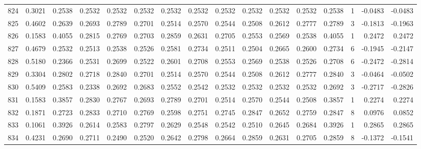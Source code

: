 \begin{tabular}{lrrrrrrrrrrrrrrr}
824 &      0.3021 &  0.2538 &  0.2532 &  0.2532 &  0.2532 &  0.2532 &  0.2532 &  0.2532 &  0.2532 &  0.2532 &   0.2532 &     0.2538 &      1 &                   -0.0483 &                    -0.0483 \\
825 &      0.4602 &  0.2639 &  0.2693 &  0.2789 &  0.2701 &  0.2514 &  0.2570 &  0.2544 &  0.2508 &  0.2612 &   0.2777 &     0.2789 &      3 &                   -0.1813 &                    -0.1963 \\
826 &      0.1583 &  0.4055 &  0.2815 &  0.2769 &  0.2703 &  0.2859 &  0.2631 &  0.2705 &  0.2553 &  0.2569 &   0.2538 &     0.4055 &      1 &                    0.2472 &                     0.2472 \\
827 &      0.4679 &  0.2532 &  0.2513 &  0.2538 &  0.2526 &  0.2581 &  0.2734 &  0.2511 &  0.2504 &  0.2665 &   0.2600 &     0.2734 &      6 &                   -0.1945 &                    -0.2147 \\
828 &      0.5180 &  0.2366 &  0.2531 &  0.2699 &  0.2522 &  0.2601 &  0.2708 &  0.2553 &  0.2569 &  0.2538 &   0.2526 &     0.2708 &      6 &                   -0.2472 &                    -0.2814 \\
829 &      0.3304 &  0.2802 &  0.2718 &  0.2840 &  0.2701 &  0.2514 &  0.2570 &  0.2544 &  0.2508 &  0.2612 &   0.2777 &     0.2840 &      3 &                   -0.0464 &                    -0.0502 \\
830 &      0.5409 &  0.2583 &  0.2338 &  0.2692 &  0.2683 &  0.2552 &  0.2542 &  0.2532 &  0.2532 &  0.2532 &   0.2532 &     0.2692 &      3 &                   -0.2717 &                    -0.2826 \\
831 &      0.1583 &  0.3857 &  0.2830 &  0.2767 &  0.2693 &  0.2789 &  0.2701 &  0.2514 &  0.2570 &  0.2544 &   0.2508 &     0.3857 &      1 &                    0.2274 &                     0.2274 \\
832 &      0.1871 &  0.2723 &  0.2833 &  0.2710 &  0.2769 &  0.2598 &  0.2751 &  0.2745 &  0.2847 &  0.2652 &   0.2759 &     0.2847 &      8 &                    0.0976 &                     0.0852 \\
833 &      0.1061 &  0.3926 &  0.2614 &  0.2583 &  0.2797 &  0.2629 &  0.2548 &  0.2542 &  0.2510 &  0.2645 &   0.2684 &     0.3926 &      1 &                    0.2865 &                     0.2865 \\
834 &      0.4231 &  0.2690 &  0.2711 &  0.2490 &  0.2520 &  0.2642 &  0.2798 &  0.2664 &  0.2859 &  0.2631 &   0.2705 &     0.2859 &      8 &                   -0.1372 &                    -0.1541 \\

\end{tabular}
